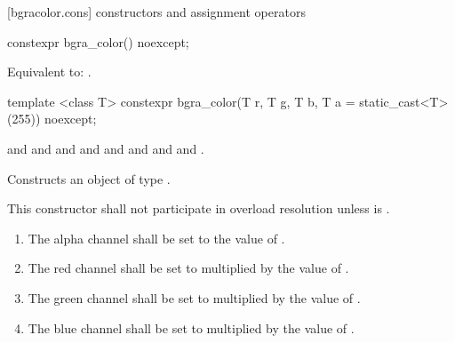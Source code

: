  [bgracolor.cons] { constructors and assignment operators}

\begin{itemdecl}
constexpr bgra_color() noexcept;
\end{itemdecl}
\begin{itemdescr}
\pnum
\effects
Equivalent to: .
\end{itemdescr}

\begin{itemdecl}
template <class T>
constexpr bgra_color(T r, T g, T b, T a = static_cast<T>(255)) noexcept;
\end{itemdecl}
\begin{itemdescr}
\pnum
\requires
{} and  and  and  and  and  and  and  and .

\pnum
\effects
Constructs an object of type .

\pnum
\remarks
This constructor shall not participate in overload resolution unless  is .
\begin{enumerate}
\item The alpha channel shall be set to the value of .
\item The red channel shall be set to  multiplied by the value of  .
\item The green channel shall be set to  multiplied by the value of .
\item The blue channel shall be set to  multiplied by the value of .
\end{enumerate}
\end{itemdescr}


